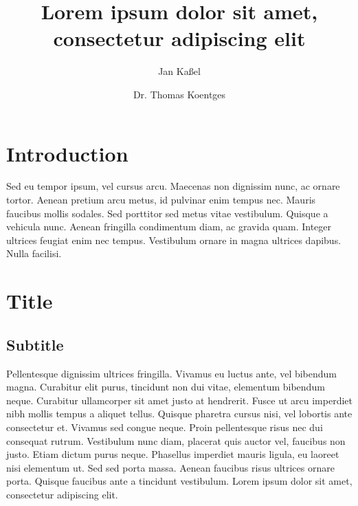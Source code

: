 \documentclass{jdmdh}
\title{Lorem ipsum dolor sit amet, consectetur adipiscing elit}
\author{Jan Kaßel}
\author{Dr. Thomas Koentges}
\affil{Leipzig University, Germany}
\begin{document}
\maketitle



\section{Introduction}

\strut
\vspace{-4ex}

Sed eu tempor ipsum, vel cursus arcu. Maecenas non dignissim nunc, ac ornare tortor. Aenean
pretium arcu metus, id pulvinar enim tempus nec. Mauris faucibus mollis sodales. Sed
porttitor sed metus vitae vestibulum. Quisque a vehicula nunc. Aenean fringilla condimentum
diam, ac gravida quam. Integer ultrices feugiat enim nec tempus. Vestibulum ornare in magna
ultrices dapibus. Nulla facilisi. 

\section{Title}

\subsection{Subtitle}
Pellentesque dignissim ultrices fringilla. Vivamus eu luctus ante, vel bibendum magna.
Curabitur elit purus, tincidunt non dui vitae, elementum bibendum neque. Curabitur
ullamcorper sit amet justo at hendrerit. Fusce ut arcu imperdiet nibh mollis tempus a aliquet
tellus. Quisque pharetra cursus nisi, vel lobortis ante consectetur et. Vivamus sed congue
neque. Proin pellentesque risus nec dui consequat rutrum. Vestibulum nunc diam, placerat
quis auctor vel, faucibus non justo. Etiam dictum purus neque. Phasellus imperdiet mauris
ligula, eu laoreet nisi elementum ut. Sed sed porta massa. Aenean faucibus risus ultrices
ornare porta. Quisque faucibus ante a tincidunt vestibulum. Lorem ipsum dolor sit amet,
consectetur adipiscing elit.
\end{document}
